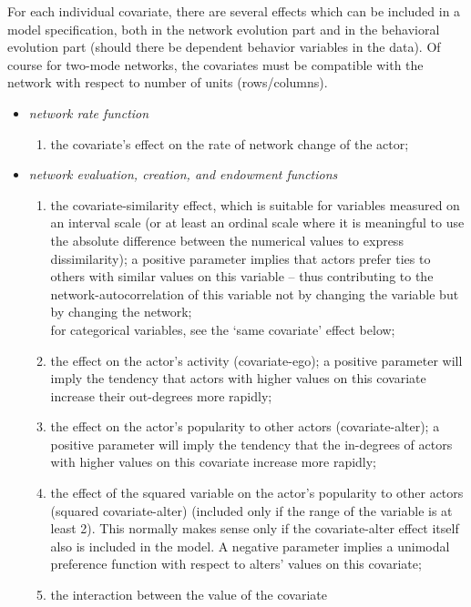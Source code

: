 \documentclass[a4paper,fleqn,11pt]{article}
\newcommand{\+}{\, + \,}
\begin{document}
{For each individual covariate, there are several effects which
can be included in a model specification, both in the network
evolution part and in the behavioral evolution part (should there be
dependent behavior variables in the data).
Of course for two-mode networks, the covariates must be compatible
with the network with respect to number of units (rows/columns).
\begin{itemize}
\item {\em network rate function}
\begin{enumerate}
\item the covariate's effect on the rate of network change of the
actor;
\end{enumerate}
\item {\em network evaluation, creation, and endowment functions}
\begin{enumerate}
\item the covariate-similarity effect, which is suitable for variables
      measured on an interval scale (or at least an ordinal scale
      where it is meaningful to use the absolute difference
      between the numerical values to express dissimilarity);
      a positive parameter implies that actors prefer
      ties to others with similar values on this variable --
      thus contributing to the
      network-autocorrelation of this variable not by changing
      the variable but by changing the network;\\
      for categorical variables, see the `same covariate'
      effect below;
\item the effect on the actor's activity (covariate-ego);
      a positive parameter will imply the tendency that
      actors with higher values on this covariate
      increase their out-degrees more rapidly;
\item the effect on the actor's popularity to other actors (covariate-alter);
      a positive parameter will imply the tendency that
      the in-degrees of actors with higher values on this covariate
      increase more rapidly;
\item the effect of the squared variable
      on the actor's popularity to other actors (squared covariate-alter)
      (included only if the range of the variable is at least 2).
      This normally makes sense only if the covariate-alter effect
      itself also is included in the model.
      A negative parameter implies a unimodal preference
      function with respect to alters' values on this covariate;
\item the interaction between the value of the covariate

\end{enumerate}
\end{itemize}}
\end{document}
